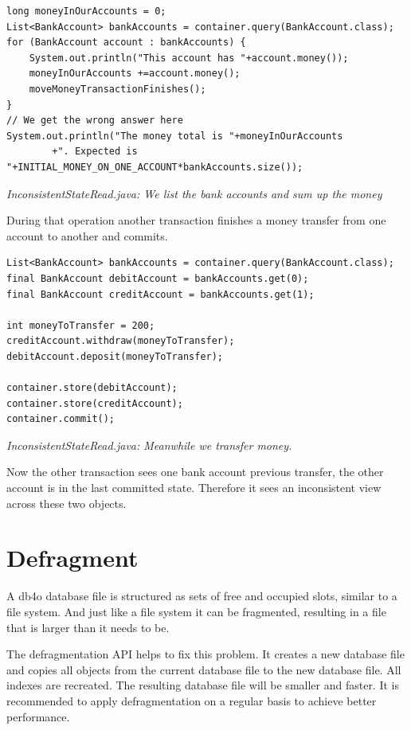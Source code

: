 \begin{lstlisting}
long moneyInOurAccounts = 0;
List<BankAccount> bankAccounts = container.query(BankAccount.class);
for (BankAccount account : bankAccounts) {
    System.out.println("This account has "+account.money());
    moneyInOurAccounts +=account.money();
    moveMoneyTransactionFinishes();
}
// We get the wrong answer here
System.out.println("The money total is "+moneyInOurAccounts
        +". Expected is "+INITIAL_MONEY_ON_ONE_ACCOUNT*bankAccounts.size());
\end{lstlisting}

{\small\itshape InconsistentStateRead.java: We list the bank accounts and sum up the money\par}
\medskip

During that operation another transaction finishes a money transfer from one account to another and commits.

\begin{lstlisting}
List<BankAccount> bankAccounts = container.query(BankAccount.class);
final BankAccount debitAccount = bankAccounts.get(0);
final BankAccount creditAccount = bankAccounts.get(1);

int moneyToTransfer = 200;
creditAccount.withdraw(moneyToTransfer);
debitAccount.deposit(moneyToTransfer);

container.store(debitAccount);
container.store(creditAccount);
container.commit();
\end{lstlisting}

{\small\itshape InconsistentStateRead.java: Meanwhile we transfer money.\par}
\medskip

Now the other transaction sees one bank account previous transfer, the other account is in the last committed state. Therefore it sees an inconsistent view across these two objects.

\section{Defragment}
\label{ref:advanced-topics-defragment}

A db4o database file is structured as sets of free and occupied slots, similar to a file system. And just like a file system it can be fragmented, resulting in a file that is larger than it needs to be.

The defragmentation API helps to fix this problem. It creates a new database file and copies all objects from the current database file to the new database file. All indexes are recreated. The resulting database file will be smaller and faster. It is recommended to apply defragmentation on a regular basis to achieve better performance.

